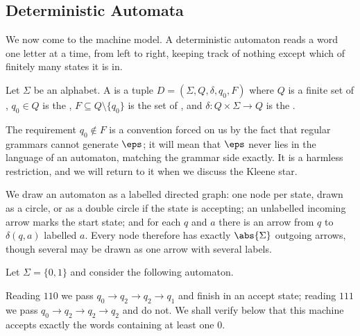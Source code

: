 \subsection{Deterministic Automata}

We now come to the machine model. A deterministic automaton reads a word one letter at a time, from left to right, keeping track of nothing except which of finitely many states it is in.

\begin{definition}
	Let $\Sigma$ be an alphabet. A  is a tuple $D = (\Sigma, Q, \delta, q_0, F)$ where $Q$ is a finite set of , $q_0 \in Q$ is the , $F \subseteq Q \setminus \{q_0\}$ is the set of , and $\delta \colon Q \times \Sigma \to Q$ is the .
\end{definition}

The requirement $q_0 \notin F$ is a convention forced on us by the fact that regular grammars cannot generate $\eps$; it will mean that $\eps$ never lies in the language of an automaton, matching the grammar side exactly. It is a harmless restriction, and we will return to it when we discuss the Kleene star.

We draw an automaton as a labelled directed graph: one node per state, drawn as a circle, or as a double circle if the state is accepting; an unlabelled incoming arrow marks the start state; and for each $q$ and $a$ there is an arrow from $q$ to $\delta(q,a)$ labelled $a$. Every node therefore has exactly $\abs{\Sigma}$ outgoing arrows, though several may be drawn as one arrow with several labels.

\begin{example}\label{ex:atleastonezero}
	Let $\Sigma = \{0,1\}$ and consider the following automaton.
	\begin{center}
	\end{center}
	Reading $110$ we pass $q_0 \to q_2 \to q_2 \to q_1$ and finish in an accept state; reading $111$ we pass $q_0 \to q_2 \to q_2 \to q_2$ and do not. We shall verify below that this machine accepts exactly the words containing at least one $0$.
\end{example}


